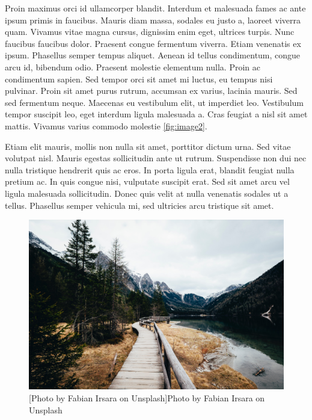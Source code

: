 \begin{multicols}{2}
Proin maximus orci id ullamcorper blandit. Interdum et malesuada fames ac ante ipsum primis in faucibus. Mauris diam massa, sodales eu justo a, laoreet viverra quam. Vivamus vitae magna cursus, dignissim enim eget, ultrices turpis. Nunc faucibus faucibus dolor. Praesent congue fermentum viverra. Etiam venenatis ex ipsum. Phasellus semper tempus aliquet. Aenean id tellus condimentum, congue arcu id, bibendum odio. Praesent molestie elementum nulla. Proin ac condimentum sapien. Sed tempor orci sit amet mi luctus, eu tempus nisi pulvinar. Proin sit amet purus rutrum, accumsan ex varius, lacinia mauris. Sed sed fermentum neque. Maecenas eu vestibulum elit, ut imperdiet leo. Vestibulum tempor suscipit leo, eget interdum ligula malesuada a. Cras feugiat a nisl sit amet mattis. Vivamus varius commodo molestie \ref{fig:image2}.

Etiam elit mauris, mollis non nulla sit amet, porttitor dictum urna. Sed vitae volutpat nisl. Mauris egestas sollicitudin ante ut rutrum. Suspendisse non dui nec nulla tristique hendrerit quis ac eros. In porta ligula erat, blandit feugiat nulla pretium ac. In quis congue nisi, vulputate suscipit erat. Sed sit amet arcu vel ligula malesuada sollicitudin. Donec quis velit at nulla venenatis sodales ut a tellus. Phasellus semper vehicula mi, sed ultricies arcu tristique sit amet.


\begin{figure}[ht!]
\begin{center}
\includegraphics[width=0.9\linewidth]{./Figures/image1.jpg}
[Photo by Fabian Irsara on Unsplash]{Photo by Fabian Irsara on Unsplash}
\label{fig:image1}
\end{center}
\end{figure}



\end{multicols}
